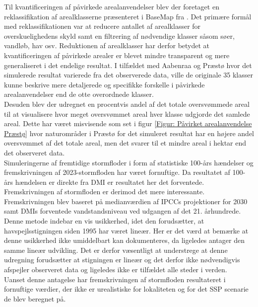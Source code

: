 Til kvantificeringen af påvirkede arealanvendelser blev der foretaget en reklassifikation af arealklasserne præsenteret i BaseMap fra \cite{Jepsen_levin_2013, levin_basemap04_2022}. Det primære formål med reklassifikationen var at reducere antallet af arealklasser for overskuelighedens skyld samt en filtrering af nødvendige klasser såsom søer, vandløb, hav osv. Reduktionen af arealklasser har derfor betydet at kvantificeringen af påvirkede arealer er blevet mindre transparent og mere generaliseret i det endelige resultat. I tilfældet med Aabenraa og Præstø hvor det simulerede resultat varierede fra det observerede data, ville de originale 35 klasser kunne beskrive mere detaljerede og specifikke forskelle i påvirkede arealanvendelser end de otte overordnede klasser. \\
Desuden blev der udregnet en procentvis andel af det totale oversvømmede areal til at visualisere hvor meget oversvømmet areal hver klasse udgjorde det samlede areal. Dette har været misvisende som set i figur \ref{Figur: Påvirket arealanvendelse Præstø} hvor naturområder i Præstø for det simuleret resultat har en højere andel oversvømmet af det totale areal, men det svarer til et mindre areal i hektar end det observeret data. \\ 


Simuleringerne af fremtidige stormfloder i form af statistiske 100-års hændelser og fremskrivningen af 2023-stormfloden har været fornuftige. Da resultatet af 100-års hændelsen er direkte fra DMI er resultatet her det forventede. Fremskrivningen af stormfloden er derimod det mere interessante. Fremskrivningen blev baseret på medianværdien af IPCCs projektioner for 2030 samt DMIs forventede vandstandsniveau ved udgangen af det 21. århundrede. Denne metode indebar en vis usikkerhed, idet den forudsætter, at havspejlsstigningen siden 1995 har været lineær. Her er det værd at bemærke at denne usikkerhed ikke umiddelbart kan dokumenteres, da \cite{danish_meteorological_institute_dmi_2024} ligeledes antager den samme lineær udvikling. Det er derfor væsentligt at understrege at denne udregning forudsætter at stigningen er lineær og det derfor ikke nødvendigvis afspejler observeret data og ligeledes ikke er tilfældet alle steder i verden. \\
Uanset denne antagelse har fremskrivningen af stormfloden resultateret i fornuftige værdier, der ikke er urealistiske for lokaliteten og for det SSP scenarie de blev beregnet på. \\



